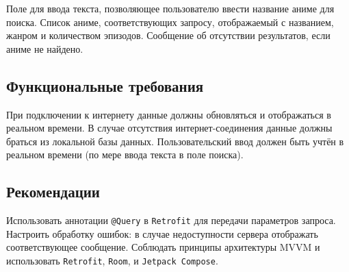 Поле для ввода текста, позволяющее пользователю ввести название аниме для поиска.
Список аниме, соответствующих запросу, отображаемый с названием, жанром и количеством эпизодов.
Сообщение об отсутствии результатов, если аниме не найдено.
\subsection{Функциональные требования}

При подключении к интернету данные должны обновляться и отображаться в реальном времени.
В случае отсутствия интернет-соединения данные должны браться из локальной базы данных.
Пользовательский ввод должен быть учтён в реальном времени (по мере ввода текста в поле поиска).
\subsection{Рекомендации}

Использовать аннотации \texttt{@Query} в \texttt{Retrofit} для передачи параметров запроса.
Настроить обработку ошибок: в случае недоступности сервера отображать соответствующее сообщение.
Соблюдать принципы архитектуры MVVM и использовать \texttt{Retrofit}, \texttt{Room}, и \texttt{Jetpack Compose}.